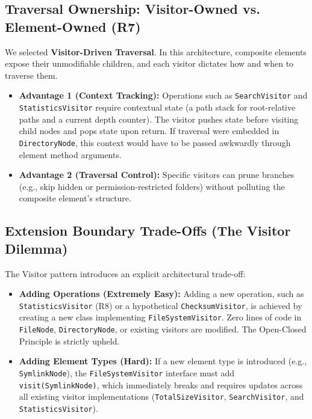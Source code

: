 \documentclass[11pt,a4paper]{article}
\begin{document}
\subsection{Traversal Ownership: Visitor-Owned vs. Element-Owned (R7)}
We selected \textbf{Visitor-Driven Traversal}. In this architecture, composite elements expose their unmodifiable children, and each visitor dictates how and when to traverse them.
\begin{itemize}\itemsep 1pt
    \item \textbf{Advantage 1 (Context Tracking):} Operations such as \texttt{SearchVisitor} and \texttt{StatisticsVisitor} require contextual state (a path stack for root-relative paths and a current depth counter). The visitor pushes state before visiting child nodes and pops state upon return. If traversal were embedded in \texttt{DirectoryNode}, this context would have to be passed awkwardly through element method arguments.
    \item \textbf{Advantage 2 (Traversal Control):} Specific visitors can prune branches (e.g., skip hidden or permission-restricted folders) without polluting the composite element's structure.
\end{itemize}

\subsection{Extension Boundary Trade-Offs (The Visitor Dilemma)}
The Visitor pattern introduces an explicit architectural trade-off:
\begin{itemize}\itemsep 1pt
    \item \textbf{Adding Operations (Extremely Easy):} Adding a new operation, such as \texttt{StatisticsVisitor} (R8) or a hypothetical \texttt{ChecksumVisitor}, is achieved by creating a new class implementing \texttt{FileSystemVisitor}. Zero lines of code in \texttt{FileNode}, \texttt{DirectoryNode}, or existing visitors are modified. The Open-Closed Principle is strictly upheld.
    \item \textbf{Adding Element Types (Hard):} If a new element type is introduced (e.g., \texttt{SymlinkNode}), the \texttt{FileSystemVisitor} interface must add \texttt{visit(SymlinkNode)}, which immediately breaks and requires updates across all existing visitor implementations (\texttt{TotalSizeVisitor}, \texttt{SearchVisitor}, and \texttt{StatisticsVisitor}).
\end{itemize}

\end{document}
